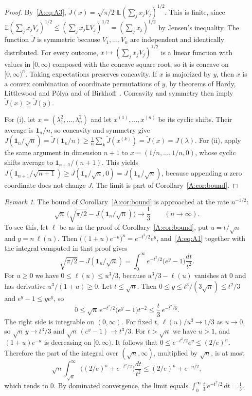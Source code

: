 \documentclass[11pt]{amsart}
\theoremstyle{remark}
\newtheorem{remark}[theorem]{Remark}
\numberwithin{equation}{section}
\newcommand{\E}{\mathbb{E}}
\begin{document}
\begin{proof}
By~\eqref{A:eq:A3}, $\tilde J(x)=\sqrt{\pi/2}\;\E(\sum_jx_jV_j)^{1/2}$. This is finite, since $\E(\sum_jx_jV_j)^{1/2}\le(\sum_jx_j\E V_j)^{1/2}=(\sum_jx_j)^{1/2}$ by Jensen's inequality. The function $\tilde J$ is symmetric because $V_1,\dots,V_n$ are independent and identically distributed. For every outcome, $x\mapsto(\sum_jx_jV_j)^{1/2}$ is a linear function with values in $[0,\infty)$ composed with the concave square root, so it is concave on $[0,\infty)^n$. Taking expectations preserves concavity. If $x$ is majorized by $y$, then $x$ is a convex combination of coordinate permutations of $y$, by theorems of Hardy, Littlewood and P\'olya and of Birkhoff~\cite{MOA11}. Concavity and symmetry then imply $\tilde J(x)\ge \tilde J(y)$.

For (i), let $x=(\lambda_1^2,\dots,\lambda_n^2)$ and let $x^{(1)},\dots,x^{(n)}$ be its cyclic shifts. Their average is $\mathbf 1_n/n$, so concavity and symmetry give $J(\mathbf 1_n/\sqrt n)=\tilde J(\mathbf 1_n/n)\ge\frac1n\sum_k\tilde J(x^{(k)})=\tilde J(x)=J(\lambda)$. For (ii), apply the same argument in dimension $n+1$ to $x=(1/n,\dots,1/n,0)$, whose cyclic shifts average to $\mathbf 1_{n+1}/(n+1)$. This yields $J(\mathbf 1_{n+1}/\sqrt{n+1})\ge J(\mathbf 1_n/\sqrt n,0)=J(\mathbf 1_n/\sqrt n)$, because appending a zero coordinate does not change $J$. The limit is part of Corollary~\ref{A:cor:bound}.
\end{proof}

\begin{remark}\label{A:rem:asym}
The bound of Corollary~\ref{A:cor:bound} is approached at the rate $n^{-1/2}$:
\[
\sqrt n\,\bigl(\sqrt{\pi/2}-J(\mathbf 1_n/\sqrt n)\bigr)\to\frac13\qquad(n\to\infty).
\]
To see this, let $\ell$ be as in the proof of Corollary~\ref{A:cor:bound}, put $u=t/\sqrt n$ and $y=n\,\ell(u)$. Then $\bigl((1+u)e^{-u}\bigr)^n=e^{-t^2/2}e^{y}$, and~\eqref{A:eq:A1} together with the integral computed in that proof gives
\[
\sqrt{\pi/2}-J(\mathbf 1_n/\sqrt n)=\int_0^\infty e^{-t^2/2}\bigl(e^{y}-1\bigr)\frac{dt}{t^2}.
\]
For $u\ge0$ we have $0\le\ell(u)\le u^3/3$, because $u^3/3-\ell(u)$ vanishes at $0$ and has derivative $u^3/(1+u)\ge0$. Let $t\le\sqrt n$. Then $0\le y\le t^3/(3\sqrt n)\le t^2/3$ and $e^y-1\le ye^y$, so
\[
0\le\sqrt n\,e^{-t^2/2}\bigl(e^{y}-1\bigr)t^{-2}\le\frac t3\,e^{-t^2/6}.
\]
The right side is integrable on $(0,\infty)$. For fixed $t$, $\ell(u)/u^3\to1/3$ as $u\to0$, so $\sqrt n\,y\to t^3/3$ and $\sqrt n\,(e^y-1)\to t^3/3$. For $t>\sqrt n$ we have $u>1$, and $(1+u)e^{-u}$ is decreasing on $[0,\infty)$. It follows that $0\le e^{-t^2/2}e^y\le(2/e)^n$. Therefore the part of the integral over $(\sqrt n,\infty)$, multiplied by $\sqrt n$, is at most
\[
\sqrt n\int_{\sqrt n}^\infty\bigl((2/e)^n+e^{-t^2/2}\bigr)\frac{dt}{t^2}\le(2/e)^n+e^{-n/2},
\]
which tends to $0$. By dominated convergence, the limit equals $\int_0^\infty\frac t3\,e^{-t^2/2}\,dt=\frac13$.
\end{remark}
\end{document}
